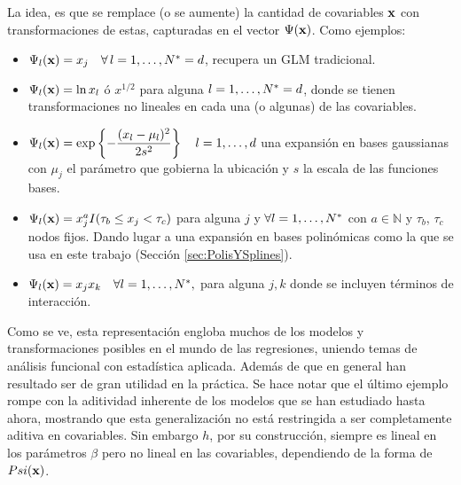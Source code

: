 \documentclass[../Main/Main.tex]{subfiles}
\begin{document}
La idea, es que se remplace (o se aumente) la cantidad de covariables $\mathbf{x}$ con transformaciones de estas, capturadas en el vector $\Psi(\mathbf{x})$. Como ejemplos:
\begin{itemize}[label = {}]
	\item $\Psi_l(\mathbf{x}) = x_j \quad \forall\,l = 1,\ldots,N^* = d$,  recupera un GLM tradicional.
	\item $\Psi_l(\mathbf{x}) = \ln x_l$ ó $x^{1/2}$ para alguna $l = 1,\ldots,N^* = d$, donde se tienen transformaciones no lineales en cada una (o algunas) de las covariables.
	\item $\Psi_l(\mathbf{x}) = \exp\left\{-\dfrac{(x_l - \mu_l)^2}{2s^2}\right\} \quad l = 1,\ldots,d$ una expansión en bases gaussianas con $\mu_j$ el parámetro que gobierna la ubicación y $s$ la escala de las funciones bases.
	\item $\Psi_l(\mathbf{x}) = x_j^aI( \tau_b \leq x_j <  \tau_c)$ para alguna $j$ y $\forall l =1,\ldots,N^*$ con $a\in \mathbb{N}$ y $\tau_b$, $\tau_c$ nodos fijos. Dando lugar a  una expansión en bases polinómicas como la que se usa en este trabajo (Sección \ref{sec:PolisYSplines}).
	\item $\Psi_l(\mathbf{x}) = x_jx_k  \quad \forall l = 1,\ldots,N^*,$  para alguna $j,k$ donde se incluyen términos de interacción. 
\end{itemize}

Como se ve, esta representación engloba muchos de los modelos y transformaciones posibles en el mundo de las regresiones, uniendo temas de análisis funcional con estadística aplicada. Además de que en general han resultado ser de gran utilidad en la práctica. Se hace notar que el último ejemplo rompe con la aditividad inherente de los modelos que se han estudiado hasta ahora, mostrando que esta generalización no está restringida a ser completamente aditiva en covariables. Sin embargo $h$, por su construcción, siempre es lineal en los parámetros $\beta$ pero no lineal en las covariables, dependiendo de la forma de $Psi(\mathbf{x})$.
\end{document}
